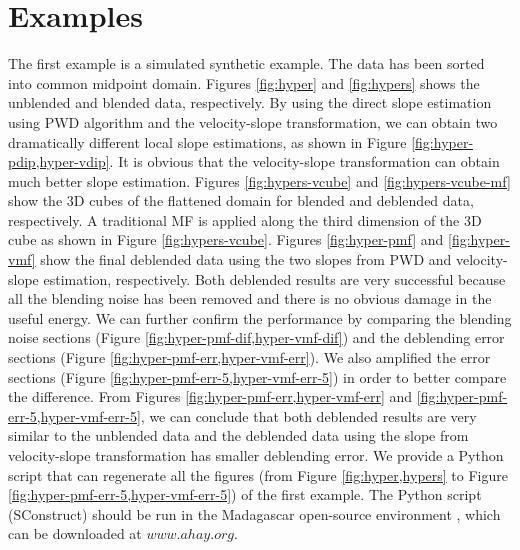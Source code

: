 \section{Examples}
The first example is a simulated synthetic example. The data has been sorted into common midpoint domain. Figures \ref{fig:hyper} and \ref{fig:hypers} shows the unblended and blended data, respectively. By using the direct slope estimation using PWD algorithm and the velocity-slope transformation, we can obtain two dramatically different local slope estimations, as shown in Figure \ref{fig:hyper-pdip,hyper-vdip}. It is obvious that the velocity-slope transformation can obtain much better slope estimation. Figures \ref{fig:hypers-vcube} and \ref{fig:hypers-vcube-mf} show the 3D cubes of the flattened domain for blended and deblended data, respectively.  A traditional MF is applied along the third dimension of the 3D cube as shown in Figure \ref{fig:hypers-vcube}. Figures \ref{fig:hyper-pmf} and \ref{fig:hyper-vmf} show the final deblended data using the two slopes from PWD and velocity-slope estimation, respectively. Both deblended results are very successful because all the blending noise has been removed and there is no obvious damage in the useful energy. We can further confirm the performance by comparing the blending noise sections (Figure \ref{fig:hyper-pmf-dif,hyper-vmf-dif}) and the deblending error sections (Figure \ref{fig:hyper-pmf-err,hyper-vmf-err}). We also amplified the error sections (Figure \ref{fig:hyper-pmf-err-5,hyper-vmf-err-5}) in order to better compare the difference. From Figures \ref{fig:hyper-pmf-err,hyper-vmf-err} and \ref{fig:hyper-pmf-err-5,hyper-vmf-err-5}, we can conclude that both deblended results are very similar to the unblended data and the deblended data using the slope from velocity-slope transformation has smaller deblending error. We provide a Python script that can regenerate all the figures (from Figure \ref{fig:hyper,hypers} to Figure \ref{fig:hyper-pmf-err-5,hyper-vmf-err-5}) of the first example.   The Python script (SConstruct) should be run in the Madagascar open-source environment \cite[]{mada2013}, which can be downloaded at $www.ahay.org$. 


